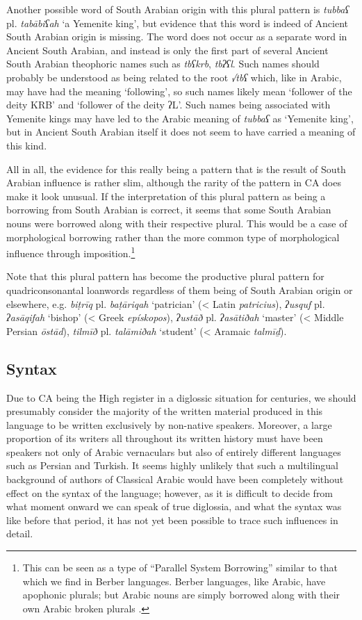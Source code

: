 \documentclass[output=paper]{langsci/langscibook}
\begin{document}
Another possible word of South Arabian origin with this plural pattern is \textit{tubbaʕ} pl. \textit{tabābiʕah} ‘a Yemenite king’, but evidence that this word is indeed of Ancient South Arabian origin is missing. The word does not occur as a separate word in Ancient South Arabian, and instead is only the first part of several Ancient South Arabian theophoric names such as \textit{tbʕkrb}, \textit{tbʔʕl}. Such names should probably be understood as being related to the root \textit{√tbʕ} which, like in Arabic, may have had the meaning ‘following’, so such names likely mean ‘follower of the deity KRB’ and ‘follower of the deity ʔL’. Such names being associated with Yemenite kings may have led to the Arabic meaning of \textit{tubbaʕ} as ‘Yemenite king’, but in Ancient South Arabian itself it does not seem to have carried a meaning of this kind. 

All in all, the evidence for this really being a pattern that is the result of South Arabian influence is rather slim, although the rarity of the pattern in CA does make it look unusual. If the interpretation of this plural pattern as being a borrowing from South Arabian is correct, it seems that some South Arabian nouns were borrowed along with their respective plural. This would be a case of morphological borrowing rather than the more common type of morphological influence through imposition.\footnote{This can be seen as a type of “Parallel System Borrowing” similar to that which we find in Berber languages. Berber languages, like Arabic, have apophonic plurals; but Arabic nouns are simply borrowed along with their own Arabic broken plurals \citep{Kossmann2010}.} 

Note that this plural pattern has become the productive plural pattern for quadriconsonantal loanwords regardless of them being of South Arabian origin or elsewhere, e.g. \textit{biṭrīq} pl. \textit{baṭāriqah} ‘patrician’ (< Latin \textit{patricius}), \textit{ʔusquf} pl. \textit{ʔasāqifah} ‘bishop’ (< Greek \textit{epískopos}), \textit{ʔustāð} pl. \textit{ʔasātiðah} ‘master’ (< Middle Persian \textit{ōstād}), \textit{tilmīð} pl. \textit{talāmiðah} ‘student’ (< Aramaic \textit{talmīḏ}).

\subsection{\label{bkm:Ref13224809}Syntax}

Due to CA being the High register in a diglossic situation for centuries, we should presumably consider the majority of the written material produced in this language to be written exclusively by non-native speakers. Moreover, a large proportion of its writers all throughout its written history must have been speakers not only of Arabic vernaculars but also of entirely different languages such as Persian and Turkish. It seems highly unlikely that such a multilingual background of authors of Classical Arabic would have been completely without effect on the syntax of the language; however, as it is difficult to decide from what moment onward we can speak of true diglossia, and what the syntax was like before that period, it has not yet been possible to trace such influences in detail.
\end{document}
